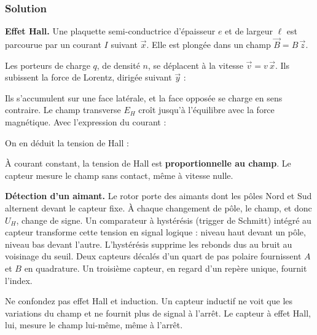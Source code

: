 \documentclass[11pt,a4paper]{article}
\newcommand{\equationajustee}[1]{%
  \sbox{\boiteequation}{$\displaystyle #1$}%
  \ifdim\wd\boiteequation>\linewidth
    \[\resizebox{\linewidth}{!}{\usebox{\boiteequation}}\]%
  \else
    \[#1\]%
  \fi}
\begin{document}
\hypertarget{solution-2}{%
\subsubsection{Solution}\label{solution-2}}

\textbf{Effet Hall.} Une plaquette semi-conductrice d'épaisseur \(e\) et de largeur \(\ell\) est parcourue par un courant \(I\) suivant \(\vec x\). Elle est plongée dans un champ \(\vec B = B\,\vec z\).

Les porteurs de charge \(q\), de densité \(n\), se déplacent à la vitesse \(\vec v = v\,\vec x\). Ils subissent la force de Lorentz, dirigée suivant \(\vec y\) :

\equationajustee{\vec F = q\,\vec v\wedge\vec B}

Ils s'accumulent sur une face latérale, et la face opposée se charge en sens contraire. Le champ transverse \(E_H\) croît jusqu'à l'équilibre avec la force magnétique. Avec l'expression du courant :

\equationajustee{\begin{aligned}
q\,E_H &= q\,v\,B \\
I &= n\,q\,v\,\ell\,e
\end{aligned}}

On en déduit la tension de Hall :

\equationajustee{\begin{aligned}
U_H &= \ell\,E_H \\
&= \frac{I\,B}{n\,q\,e}
\end{aligned}}

\equationajustee{\boxed{U_H = \frac{I\,B}{n\,q\,e}}}

À courant constant, la tension de Hall est \textbf{proportionnelle au champ}. Le capteur mesure le champ sans contact, même à vitesse nulle.

\textbf{Détection d'un aimant.} Le rotor porte des aimants dont les pôles Nord et Sud alternent devant le capteur fixe. À chaque changement de pôle, le champ, et donc \(U_H\), change de signe. Un comparateur à hystérésis (trigger de Schmitt) intégré au capteur transforme cette tension en signal logique : niveau haut devant un pôle, niveau bas devant l'autre. L'hystérésis supprime les rebonds dus au bruit au voisinage du seuil. Deux capteurs décalés d'un quart de pas polaire fournissent \(A\) et \(B\) en quadrature. Un troisième capteur, en regard d'un repère unique, fournit l'index.

\begin{piege}

Ne confondez pas effet Hall et induction. Un capteur inductif ne voit que les variations du champ et ne fournit plus de signal à l'arrêt. Le capteur à effet Hall, lui, mesure le champ lui-même, même à l'arrêt.

\end{piege}
\end{document}
